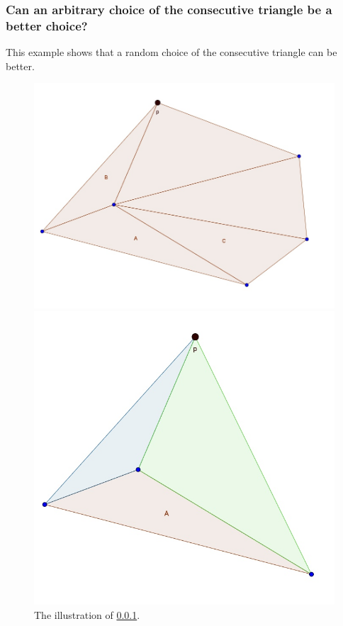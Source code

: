 \documentclass[10pt]{article}
\begin{document}
\subsubsection{Can an arbitrary choice of the consecutive triangle be a better choice?}\label{Question}
	This example shows that a random choice of the consecutive triangle can be better. 
	\begin{figure}[h]
			\begin{minipage}{0.3\textwidth}
				\includegraphics[scale=0.2]{../Figures/Example.jpg}
			\end{minipage}
			\hfill
			\begin{minipage}{0.4\textwidth}
				\includegraphics[scale=0.2]{../Figures/Calculation.jpg}
			\end{minipage}
		\caption{The illustration of \ref{Question}.}
		\label{Example}			
	\end{figure}
	
\end{document}
